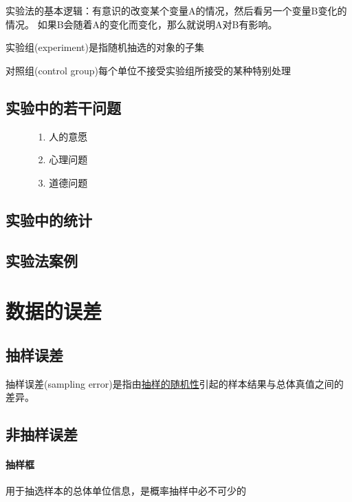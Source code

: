\documentclass[UTF8,10pt]{book}
\begin{document}
    实验法的基本逻辑：有意识的改变某个变量A的情况，然后看另一个变量B变化的情况。
    如果B会随着A的变化而变化，那么就说明A对B有影响。

    实验组(experiment)是指随机抽选的对象的子集

    对照组(control group)每个单位不接受实验组所接受的某种特别处理

    \subsection{实验中的若干问题}
    \begin{itemize}
        \item [] {
            \begin{enumerate}
                \item [1.] 人的意愿
                \item [2.] 心理问题
                \item [3.] 道德问题
                                
            \end{enumerate}
        }
    \end{itemize}

    \subsection{实验中的统计}

    \subsection{实验法案例}

    \section{数据的误差}

    \subsection{抽样误差}
    抽样误差(sampling error)是指由\underline{抽样的随机性}引起的样本结果与总体真值之间的差异。

    \subsection{非抽样误差}
    \paragraph{抽样框} 用于抽选样本的总体单位信息，是概率抽样中必不可少的
\end{document}
